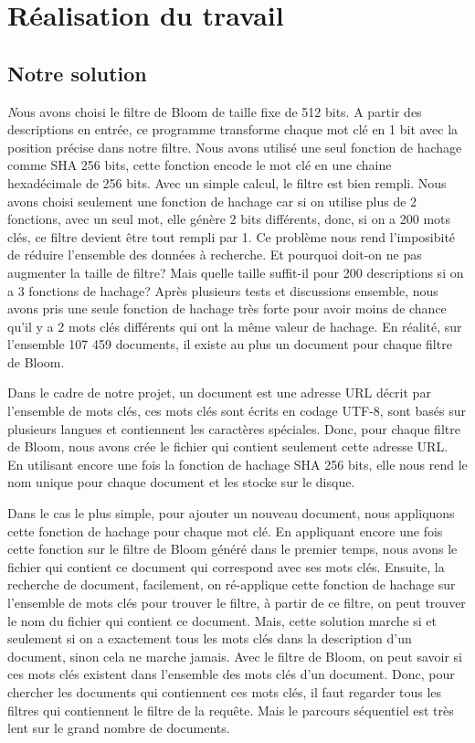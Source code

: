 \chapter{Réalisation du travail}
\section{Notre solution}
	{\huge \itshape N}ous avons choisi le filtre de Bloom de taille fixe de 512 bits. A partir des descriptions en entrée, ce programme transforme chaque mot clé en 1 bit avec la position précise dans notre filtre. Nous avons utilisé une seul fonction de hachage comme SHA 256 bits, cette fonction encode le mot clé en une chaine hexadécimale de 256 bits. Avec un simple calcul, le filtre est bien rempli. Nous avons choisi seulement une fonction de hachage car si on utilise plus de 2 fonctions, avec un seul mot, elle génère 2 bits différents, donc, si on a 200 mots clés, ce filtre devient être tout rempli par 1. Ce problème nous rend l'imposibité de réduire l'ensemble des données à recherche. Et pourquoi doit-on ne pas augmenter la taille de filtre? Mais quelle taille suffit-il pour 200 descriptions si on a 3 fonctions de hachage? Après plusieurs tests et discussions ensemble, nous avons pris une seule fonction de hachage très forte pour avoir moins de chance qu'il y a 2 mots clés différents qui ont la même valeur de hachage. En réalité, sur l'ensemble 107 459 documents, il existe au plus un document pour chaque filtre de Bloom.
	
	Dans le cadre de notre projet, un document est une adresse URL décrit par l'ensemble de mots clés, ces mots clés sont écrits en codage UTF-8, sont basés sur plusieurs langues et contiennent les caractères spéciales. Donc, pour chaque filtre de Bloom, nous avons crée le fichier qui contient seulement cette adresse URL. En utilisant encore une fois la fonction de hachage SHA 256 bits, elle nous rend le nom unique pour chaque document et les stocke sur le disque.
	
	Dans le cas le plus simple, pour ajouter un nouveau document, nous appliquons cette fonction de hachage pour chaque mot clé. En appliquant encore une fois cette fonction sur le filtre de Bloom généré dans le premier temps, nous avons le fichier qui contient ce document qui correspond avec ses mots clés. Ensuite, la recherche de document, facilement, on ré-applique cette fonction de hachage sur l'ensemble de mots clés pour trouver le filtre, à partir de ce filtre, on peut trouver le nom du fichier qui contient ce document. Mais, cette solution marche si et seulement si on a exactement tous les mots clés dans la description d'un document, sinon cela ne marche jamais. Avec le filtre de Bloom, on peut savoir si ces mots clés existent dans l'ensemble des mots clés d'un document. Donc, pour chercher les documents qui contiennent ces mots clés, il faut regarder tous les filtres qui contiennent le filtre de la requête. Mais le parcours séquentiel est très lent sur le grand nombre de documents. 
	
